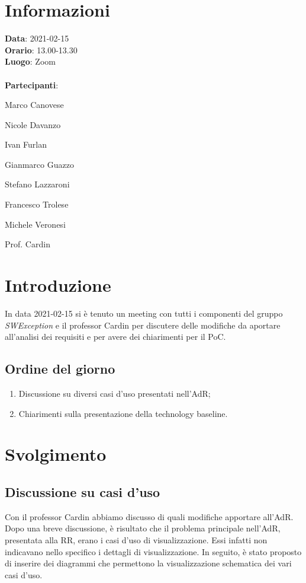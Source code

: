 \section{Informazioni}
\textbf{Data}: 2021-02-15\\
\textbf{Orario}: 13.00-13.30\\
\textbf{Luogo}: Zoom\\\\
\textbf{Partecipanti}:\begin{list}{*}{\setlength{\itemsep}{0cm}}
	\item Marco Canovese
	\item Nicole Davanzo
	\item Ivan Furlan
	\item Gianmarco Guazzo
	\item Stefano Lazzaroni
	\item Francesco Trolese
	\item Michele Veronesi
	\item Prof. Cardin
\end{list}

\section{Introduzione}
In data 2021-02-15 si è tenuto un meeting con tutti i componenti del gruppo \textit{SWException} e il professor Cardin per discutere delle modifiche da aportare all'analisi dei requisiti e per avere dei chiarimenti per il PoC. \\

\subsection{Ordine del giorno}
\begin{enumerate}
    \item Discussione su diversi casi d'uso presentati nell'AdR;
    \item Chiarimenti sulla presentazione della technology baseline.
\end{enumerate}

\section{Svolgimento}

\subsection{Discussione su casi d'uso}
Con il professor Cardin abbiamo discusso di quali modifiche apportare all'AdR. Dopo una breve discussione, è risultato che il problema principale nell'AdR, presentata alla RR, erano i casi d'uso di visualizzazione. 
Essi infatti non indicavano nello specifico i dettagli di visualizzazione.
In seguito, è stato proposto di inserire dei diagrammi che permettono la visualizzazione schematica dei vari casi d'uso.

